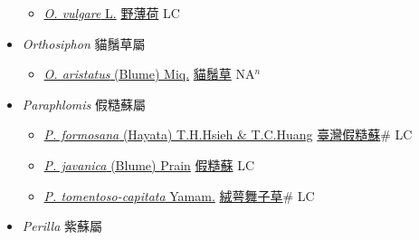 \begin{itemize}
  \begin{itemize}
        \item[] \href{http://www.theplantlist.org/tpl1.1/search?q=Origanum+vulgare}{\textit{O. vulgare} L.}   \href{\detokenize{http://taibnet.sinica.edu.tw/chi/taibnet_species_list.php?T2=野薄荷&T2_new_value=true&fr=y}}{野薄荷} LC
  \end{itemize}
 \item[] \textit{Orthosiphon} 貓鬚草屬
                    
  \begin{itemize}
        \item[] \href{http://www.theplantlist.org/tpl1.1/search?q=Orthosiphon+aristatus}{\textit{O. aristatus} (Blume) Miq.}   \href{\detokenize{http://taibnet.sinica.edu.tw/chi/taibnet_species_list.php?T2=貓鬚草&T2_new_value=true&fr=y}}{貓鬚草} NA$^n$
  \end{itemize}
 \item[] \textit{Paraphlomis} 假糙蘇屬
                    
  \begin{itemize}
        \item[] \href{http://www.theplantlist.org/tpl1.1/search?q=Paraphlomis+formosana}{\textit{P. formosana} (Hayata) T.H.Hsieh \& T.C.Huang}   \href{\detokenize{http://taibnet.sinica.edu.tw/chi/taibnet_species_list.php?T2=臺灣假糙蘇&T2_new_value=true&fr=y}}{臺灣假糙蘇}\# LC
        \item[] \href{http://www.theplantlist.org/tpl1.1/search?q=Paraphlomis+javanica}{\textit{P. javanica} (Blume) Prain}   \href{\detokenize{http://taibnet.sinica.edu.tw/chi/taibnet_species_list.php?T2=假糙蘇&T2_new_value=true&fr=y}}{假糙蘇} LC
        \item[] \href{http://www.theplantlist.org/tpl1.1/search?q=Paraphlomis+tomentoso-capitata}{\textit{P. tomentoso-capitata} Yamam.}   \href{\detokenize{http://taibnet.sinica.edu.tw/chi/taibnet_species_list.php?T2=絨萼舞子草&T2_new_value=true&fr=y}}{絨萼舞子草}\# LC
  \end{itemize}
 \item[] \textit{Perilla} 紫蘇屬
                    

\end{itemize}
